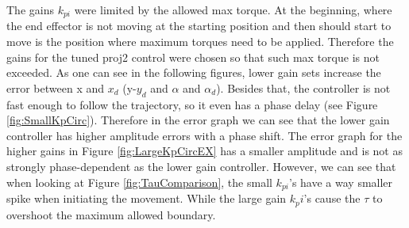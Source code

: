 The gains $k_{pi}$ were limited by the allowed max torque. At the beginning, where the end effector is not moving at the starting position and then should start to move is the position where maximum torques need to be applied. Therefore the gains for the tuned proj2 control were chosen so that such max torque is not exceeded. As one can see in the following figures, lower gain sets increase the error between x and $x_d$ (y-$y_d$ and $\alpha$ and $\alpha_d$). Besides that, the controller is not fast enough to follow the trajectory, so it even has a phase delay (see Figure \ref{fig:SmallKpCirc}). Therefore in the error graph we can see that the lower gain controller has higher amplitude errors with a phase shift. 
The error graph for the higher gains in Figure \ref{fig:LargeKpCircEX} has a smaller amplitude and is not as strongly phase-dependent as the lower gain controller. 
However, we can see that when looking at Figure \ref{fig:TauComparison}, the small $k_{pi}$'s have a way smaller spike when initiating the movement. While the large gain $k_pi$'s cause the $\tau$ to overshoot the maximum allowed boundary.  


